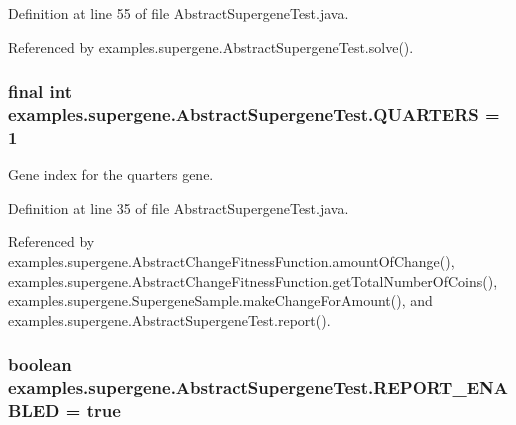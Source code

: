 Definition at line 55 of file Abstract\-Supergene\-Test.\-java.



Referenced by examples.\-supergene.\-Abstract\-Supergene\-Test.\-solve().

\hypertarget{classexamples_1_1supergene_1_1_abstract_supergene_test_aed911231f02517c09e71a453e303b655}{
\subsubsection[{Q\-U\-A\-R\-T\-E\-R\-S}]{\setlength{\rightskip}{0pt plus 5cm}final int examples.\-supergene.\-Abstract\-Supergene\-Test.\-Q\-U\-A\-R\-T\-E\-R\-S = 1\hspace{0.3cm}{\ttfamily [static]}}}\label{classexamples_1_1supergene_1_1_abstract_supergene_test_aed911231f02517c09e71a453e303b655}
Gene index for the quarters gene. 

Definition at line 35 of file Abstract\-Supergene\-Test.\-java.



Referenced by examples.\-supergene.\-Abstract\-Change\-Fitness\-Function.\-amount\-Of\-Change(), examples.\-supergene.\-Abstract\-Change\-Fitness\-Function.\-get\-Total\-Number\-Of\-Coins(), examples.\-supergene.\-Supergene\-Sample.\-make\-Change\-For\-Amount(), and examples.\-supergene.\-Abstract\-Supergene\-Test.\-report().

\hypertarget{classexamples_1_1supergene_1_1_abstract_supergene_test_a6884362188d843b7a05c2845e9857358}{
\subsubsection[{R\-E\-P\-O\-R\-T\-\_\-\-E\-N\-A\-B\-L\-E\-D}]{\setlength{\rightskip}{0pt plus 5cm}boolean examples.\-supergene.\-Abstract\-Supergene\-Test.\-R\-E\-P\-O\-R\-T\-\_\-\-E\-N\-A\-B\-L\-E\-D = true\hspace{0.3cm}{\ttfamily [static]}}}\label{classexamples_1_1supergene_1_1_abstract_supergene_test_a6884362188d843b7a05c2845e9857358}


